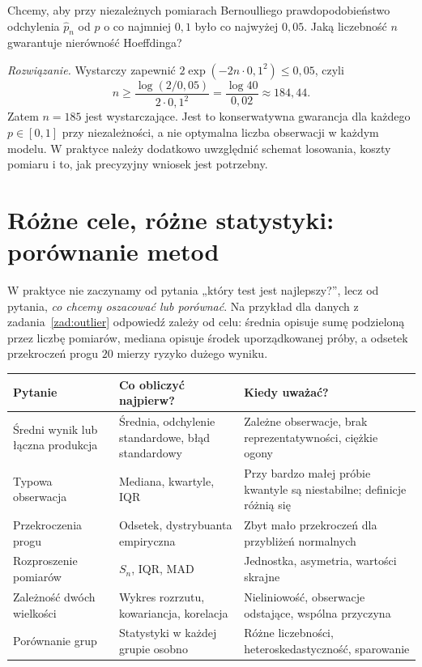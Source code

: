 \begin{zadanie}\label{zad:sample-size}
Chcemy, aby przy niezależnych pomiarach Bernoulliego prawdopodobieństwo odchylenia $\widehat p_n$ od $p$ o co najmniej $0{,}1$ było co najwyżej $0{,}05$. Jaką liczebność $n$ gwarantuje nierówność Hoeffdinga?
\par\emph{Rozwiązanie.} Wystarczy zapewnić $2\exp(-2n\cdot0{,}1^2)\le0{,}05$, czyli
\[
n\ge\frac{\log(2/0{,}05)}{2\cdot0{,}1^2}=\frac{\log40}{0{,}02}\approx184{,}44.
\]
Zatem $n=185$ jest wystarczające. Jest to konserwatywna gwarancja dla każdego $p\in[0,1]$ przy niezależności, a nie optymalna liczba obserwacji w każdym modelu. W praktyce należy dodatkowo uwzględnić schemat losowania, koszty pomiaru i to, jak precyzyjny wniosek jest potrzebny.
\end{zadanie}

\section{Różne cele, różne statystyki: porównanie metod}\label{sec:choose-stats}
W praktyce nie zaczynamy od pytania „który test jest najlepszy?”, lecz od pytania, \emph{co chcemy oszacować lub porównać}. Na przykład dla danych z zadania~\ref{zad:outlier} odpowiedź zależy od celu: średnia opisuje sumę podzieloną przez liczbę pomiarów, mediana opisuje środek uporządkowanej próby, a odsetek przekroczeń progu $20$ mierzy ryzyko dużego wyniku.

\begin{center}\small
\begin{tabular}{>{\raggedright\arraybackslash}p{}>{\raggedright\arraybackslash}p{}>{\raggedright\arraybackslash}p{}}
\toprule
\textbf{Pytanie} & \textbf{Co obliczyć najpierw?} & \textbf{Kiedy uważać?}\\
\midrule
Średni wynik lub łączna produkcja & Średnia, odchylenie standardowe, błąd standardowy & Zależne obserwacje, brak reprezentatywności, ciężkie ogony\\
Typowa obserwacja & Mediana, kwartyle, IQR & Przy bardzo małej próbie kwantyle są niestabilne; definicje różnią się\\
Przekroczenia progu & Odsetek, dystrybuanta empiryczna & Zbyt mało przekroczeń dla przybliżeń normalnych\\
Rozproszenie pomiarów & $S_n$, IQR, MAD & Jednostka, asymetria, wartości skrajne\\
Zależność dwóch wielkości & Wykres rozrzutu, kowariancja, korelacja & Nieliniowość, obserwacje odstające, wspólna przyczyna\\
Porównanie grup & Statystyki w każdej grupie osobno & Różne liczebności, heteroskedastyczność, sparowanie\\
\bottomrule
\end{tabular}
\end{center}

